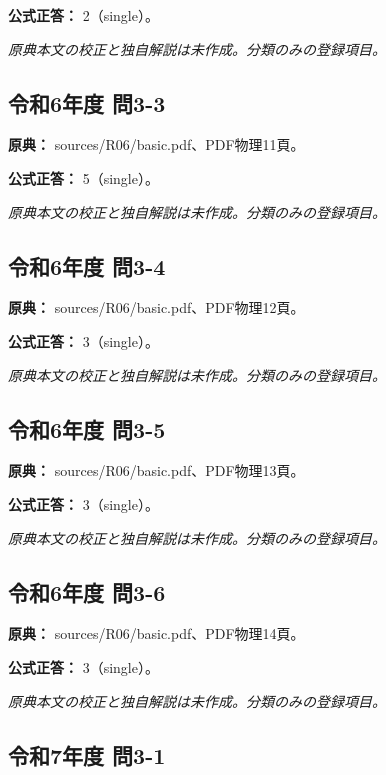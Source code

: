 \textbf{公式正答：} 2（single）。

\par\textit{原典本文の校正と独自解説は未作成。分類のみの登録項目。}

\subsection{令和6年度 問3-3}
\label{q:r06-reg-basic-3-3}

\noindent\textbf{原典：} sources/R06/basic.pdf、PDF物理11頁。

\textbf{公式正答：} 5（single）。

\par\textit{原典本文の校正と独自解説は未作成。分類のみの登録項目。}

\subsection{令和6年度 問3-4}
\label{q:r06-reg-basic-3-4}

\noindent\textbf{原典：} sources/R06/basic.pdf、PDF物理12頁。

\textbf{公式正答：} 3（single）。

\par\textit{原典本文の校正と独自解説は未作成。分類のみの登録項目。}

\subsection{令和6年度 問3-5}
\label{q:r06-reg-basic-3-5}

\noindent\textbf{原典：} sources/R06/basic.pdf、PDF物理13頁。

\textbf{公式正答：} 3（single）。

\par\textit{原典本文の校正と独自解説は未作成。分類のみの登録項目。}

\subsection{令和6年度 問3-6}
\label{q:r06-reg-basic-3-6}

\noindent\textbf{原典：} sources/R06/basic.pdf、PDF物理14頁。

\textbf{公式正答：} 3（single）。

\par\textit{原典本文の校正と独自解説は未作成。分類のみの登録項目。}

\subsection{令和7年度 問3-1}
\label{q:r07-reg-basic-3-1}

